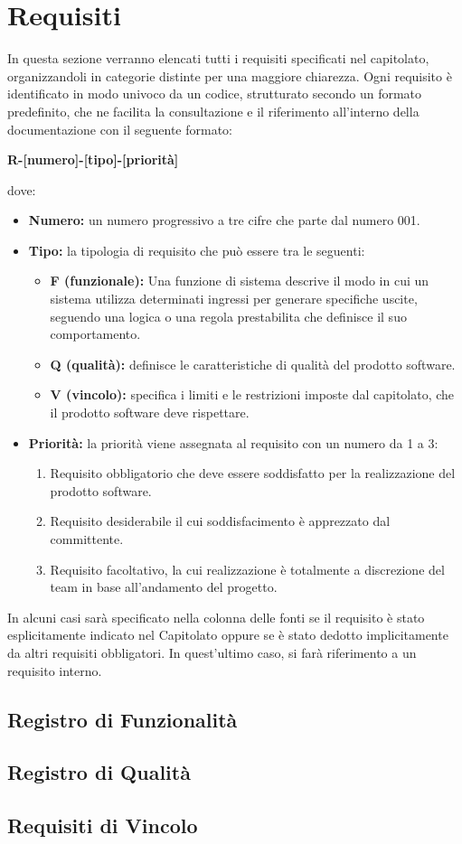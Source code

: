 \section{Requisiti}
In questa sezione verranno elencati tutti i requisiti specificati nel capitolato, organizzandoli in categorie distinte per una maggiore chiarezza. Ogni requisito è identificato in modo univoco da un codice, strutturato secondo un formato predefinito, che ne facilita la consultazione e il riferimento all'interno della documentazione con il seguente formato: 
\begin{center}
\textbf{R-[numero]-[tipo]-[priorità]}
\end{center}
dove:
\begin{itemize}
    \item \textbf{Numero:} un numero progressivo a tre cifre che parte dal numero 001.
    \item \textbf{Tipo:} la tipologia di requisito che può essere tra le seguenti:
    \begin{itemize}[label=-]
        \item \textbf{F (funzionale):} Una funzione di sistema descrive il modo in cui un sistema utilizza determinati ingressi per generare specifiche uscite, seguendo una logica o una regola prestabilita che definisce il suo comportamento.
        \item \textbf{Q (qualità):} definisce le caratteristiche di qualità del prodotto software.
        \item \textbf{V (vincolo):} specifica i limiti e le restrizioni imposte dal capitolato, che il prodotto software deve rispettare.
\end{itemize}
    \item \textbf{Priorità:} la priorità viene assegnata al requisito con un numero da 1 a 3:
    \begin{enumerate}
        \item Requisito obbligatorio che deve essere soddisfatto per la realizzazione del prodotto software.  
        \item Requisito desiderabile il cui soddisfacimento è apprezzato dal committente.
        \item Requisito facoltativo, la cui realizzazione è totalmente a discrezione del team in base all'andamento del progetto.
    \end{enumerate}
\end{itemize}
In alcuni casi sarà specificato nella colonna delle fonti se il requisito è stato esplicitamente indicato nel Capitolato oppure se è stato dedotto implicitamente da altri requisiti obbligatori. In quest’ultimo caso, si farà riferimento a un requisito interno.
\subsection{Registro di Funzionalità}

\subsection{Registro di Qualità}

\subsection{Requisiti di Vincolo}
